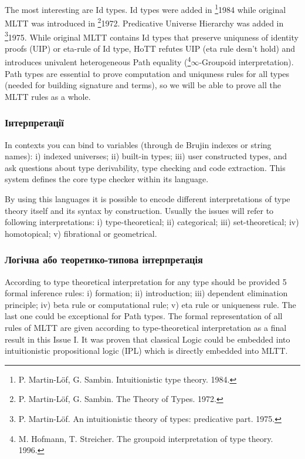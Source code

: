 The most interesting are Id types. Id types were added in \footnote{P. Martin-Löf, G. Sambin. Intuitionistic type theory. 1984.}{1984} while original MLTT was introduced in \footnote{P. Martin-Löf, G. Sambin. The Theory of Types. 1972.}{1972}.
Predicative Universe Hierarchy was added in \footnote{P. Martin-Löf. An intuitionistic theory of types: predicative part. 1975.}{1975}.
While original MLTT contains Id types that preserve uniquness of identity
proofs (UIP) or eta-rule of Id type, HoTT refutes UIP (eta rule desn't hold)
and introduces univalent heterogeneous Path equality (\footnote{M. Hofmann, T. Streicher. The groupoid interpretation of type theory. 1996.}{$\infty$-Groupoid interpretation}).
Path types are essential to prove computation and uniquness rules for all types
(needed for building signature and terms), so we will be able to prove all
the MLTT rules as a whole.

\subsubsection{Інтерпретації}

In contexts you can bind to variables (through de Brujin indexes or string names):
i) indexed universes; ii) built-in types; iii) user constructed types, and ask
questions about type derivability, type checking and code extraction. This system
defines the core type checker within its language.


By using this languages it is possible to encode different interpretations of
type theory itself and its syntax by construction. Usually the issues will refer to
following interpretations: i) type-theoretical; ii) categorical;
iii) set-theoretical; iv) homotopical; v) fibrational or geometrical.

\subsubsection*{Логічна або теоретико-типова інтерпретація}

According to type theoretical interpretation for any type should be provided 5 formal
inference rules: i) formation; ii) introduction; iii) dependent elimination principle;
iv) beta rule or computational rule; v) eta rule or uniqueness rule. The last one could
be exceptional for Path types. The formal representation of all rules of MLTT
are given according to type-theoretical interpretation as a final result in this Issue I.
It was proven that classical Logic could be embedded into
intuitionistic propositional logic (IPL) which is directly embedded into MLTT.

